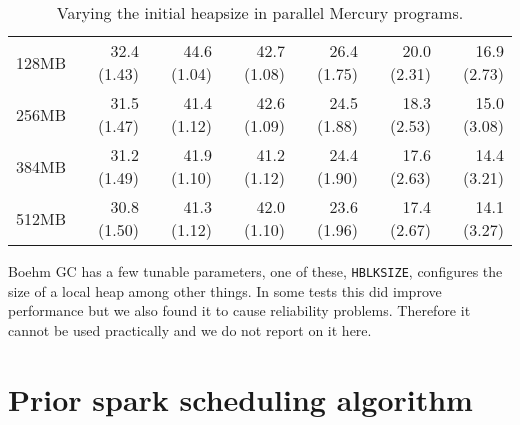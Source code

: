 \begin{table}
\begin{center}
\begin{tabular}{r|rr|rrrr}
128MB  & 32.4 (1.43) & 44.6 (1.04) & 42.7 (1.08) & 26.4 (1.75) & 20.0 (2.31) & 16.9 (2.73) \\
256MB  & 31.5 (1.47) & 41.4 (1.12) & 42.6 (1.09) & 24.5 (1.88) & 18.3 (2.53) & 15.0 (3.08) \\
384MB  & 31.2 (1.49) & 41.9 (1.10) & 41.2 (1.12) & 24.4 (1.90) & 17.6 (2.63) & 14.4 (3.21) \\
512MB  & 30.8 (1.50) & 41.3 (1.12) & 42.0 (1.10) & 23.6 (1.96) & 17.4 (2.67) & 14.1 (3.27) \\
\end{tabular}
\end{center}
\caption{Varying the initial heapsize in parallel Mercury programs.}
\label{tab:heapsize}
\end{table}



Boehm GC has a few tunable parameters, one of these, \texttt{HBLKSIZE},
configures the size of a local heap among other things.
In some tests this did improve performance but we also found it to cause
reliability problems.
Therefore it cannot be used practically and we do not report on it here.


\section{Prior spark scheduling algorithm}
\label{sec:old_scheduling}





